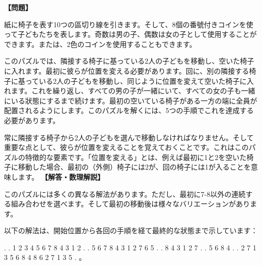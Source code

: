 \documentclass[10pt,a4paper,oneside,openany]{ltjsbook}
\begin{document}
\begin{tcolorbox}[colback=softblue,colframe=primaryblue,title=\textbf{第 237 問：男の子と女の子 （原題: BOYS AND GIRLS.）},arc=2mm,boxrule=1pt,breakable]
\textbf{【問題】}\par\vspace{0.3em}
紙に椅子を表す10つの區切り線を引きます。そして、8個の番號付きコインを使って子どもたちを表します。奇数は男の子、偶数は女の子として使用することができます。または、2色のコインを使用することもできます。

このパズルでは、隣接する椅子に基っている2人の子どもを移動し、空いた椅子に入れます。最初に彼らが位置を変える必要があります。回に、別の隣接する椅子に基っている2人の子どもを移動し、同じように位置を変えて空いた椅子に入れます。これを繰り返し、すべての男の子が一緒にいて、すべての女の子も一緒にいる狀態にするまで続けます。最初の空いている椅子がある一方の端に全員が配置されるようにします。このパズルを解くには、5つの手順でこれを達成する必要があります。

常に隣接する椅子から2人の子どもを選んで移動しなければなりません。そして重要な点として、彼らが位置を変えることを覚えておくことです。これはこのパズルの特徴的な要素です。「位置を変える」とは、例えば最初に1と2を空いた椅子に移動した場合、最初の（外側）椅子には2が、回の椅子には1が入ることを意味します。
\tcblower
\textbf{【解答・数理解説】}\par\vspace{0.3em}
このパズルには多くの異なる解法があります。ただし、最初に7-8以外の連続する組み合わせを選べます。そして最初の移動後は様々なバリエーションがあります。

以下の解法は、開始位置から各回の手順を経て最終的な狀態まで示しています：

. . 1 2 3 4 5 6 7 8
4 3 1 2 . . 5 6 7 8
4 3 1 2 7 6 5 . . 8
4 3 1 2 7 . . 5 6 8
4 . . 2 7 1 3 5 6 8
4 8 6 2 7 1 3 5 . 。
\end{tcolorbox}
\end{document}
